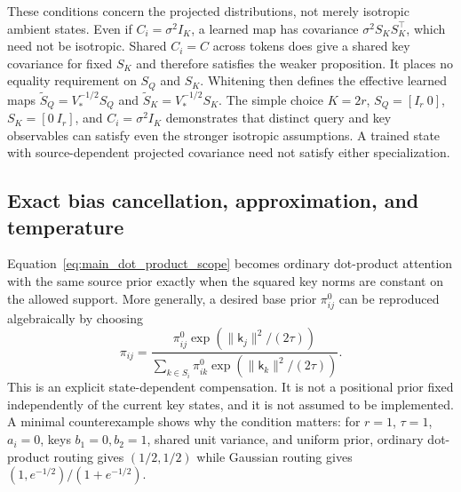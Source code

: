\documentclass[twoside,11pt]{article}
\begin{document}
These conditions concern the projected distributions, not merely isotropic ambient states. Even if $C_i=\sigma^2I_K$, a learned map has covariance $\sigma^2S_KS_K^\top$, which need not be isotropic. Shared $C_i=C$ across tokens does give a shared key covariance for fixed $S_K$ and therefore satisfies the weaker proposition. It places no equality requirement on $S_Q$ and $S_K$. Whitening then defines the effective learned maps $\widetilde S_Q=V_*^{-1/2}S_Q$ and $\widetilde S_K=V_*^{-1/2}S_K$. The simple choice $K=2r$, $S_Q=[I_r\ 0]$, $S_K=[0\ I_r]$, and $C_i=\sigma^2I_K$ demonstrates that distinct query and key observables can satisfy even the stronger isotropic assumptions. A trained state with source-dependent projected covariance need not satisfy either specialization.

\subsection{Exact bias cancellation, approximation, and temperature}

Equation~\eqref{eq:main_dot_product_scope} becomes ordinary dot-product attention with the same source prior exactly when the squared key norms are constant on the allowed support. More generally, a desired base prior $\pi^0_{ij}$ can be reproduced algebraically by choosing
\begin{equation}
\pi_{ij}=
\frac{\pi^0_{ij}\exp(\|\mathsf k_j\|^2/(2\tau))}
{\sum_{k\in S_i}\pi^0_{ik}\exp(\|\mathsf k_k\|^2/(2\tau))}.
\label{eq:projected_key_bias_compensation}
\end{equation}
This is an explicit state-dependent compensation. It is not a positional prior fixed independently of the current key states, and it is not assumed to be implemented. A minimal counterexample shows why the condition matters: for $r=1$, $\tau=1$, $a_i=0$, keys $b_1=0,b_2=1$, shared unit variance, and uniform prior, ordinary dot-product routing gives $(1/2,1/2)$ while Gaussian routing gives $(1,e^{-1/2})/(1+e^{-1/2})$.
\end{document}
